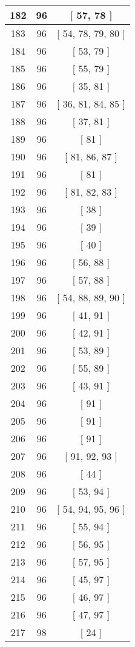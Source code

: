 \begin{center}
\begin{longtable}[H]{|| c c c ||}
\hline
182 & 96 & [ 57, 78 ] \\ 
\hline
183 & 96 & [ 54, 78, 79, 80 ] \\ 
\hline
184 & 96 & [ 53, 79 ] \\ 
\hline
185 & 96 & [ 55, 79 ] \\ 
\hline
186 & 96 & [ 35, 81 ] \\ 
\hline
187 & 96 & [ 36, 81, 84, 85 ] \\ 
\hline
188 & 96 & [ 37, 81 ] \\ 
\hline
189 & 96 & [ 81 ] \\ 
\hline
190 & 96 & [ 81, 86, 87 ] \\ 
\hline
191 & 96 & [ 81 ] \\ 
\hline
192 & 96 & [ 81, 82, 83 ] \\ 
\hline
193 & 96 & [ 38 ] \\ 
\hline
194 & 96 & [ 39 ] \\ 
\hline
195 & 96 & [ 40 ] \\ 
\hline
196 & 96 & [ 56, 88 ] \\ 
\hline
197 & 96 & [ 57, 88 ] \\ 
\hline
198 & 96 & [ 54, 88, 89, 90 ] \\ 
\hline
199 & 96 & [ 41, 91 ] \\ 
\hline
200 & 96 & [ 42, 91 ] \\ 
\hline
201 & 96 & [ 53, 89 ] \\ 
\hline
202 & 96 & [ 55, 89 ] \\ 
\hline
203 & 96 & [ 43, 91 ] \\ 
\hline
204 & 96 & [ 91 ] \\ 
\hline
205 & 96 & [ 91 ] \\ 
\hline
206 & 96 & [ 91 ] \\ 
\hline
207 & 96 & [ 91, 92, 93 ] \\ 
\hline
208 & 96 & [ 44 ] \\ 
\hline
209 & 96 & [ 53, 94 ] \\ 
\hline
210 & 96 & [ 54, 94, 95, 96 ] \\ 
\hline
211 & 96 & [ 55, 94 ] \\ 
\hline
212 & 96 & [ 56, 95 ] \\ 
\hline
213 & 96 & [ 57, 95 ] \\ 
\hline
214 & 96 & [ 45, 97 ] \\ 
\hline
215 & 96 & [ 46, 97 ] \\ 
\hline
216 & 96 & [ 47, 97 ] \\ 
\hline
217 & 98 & [ 24 ] \\ 

\end{longtable}
\end{center}
